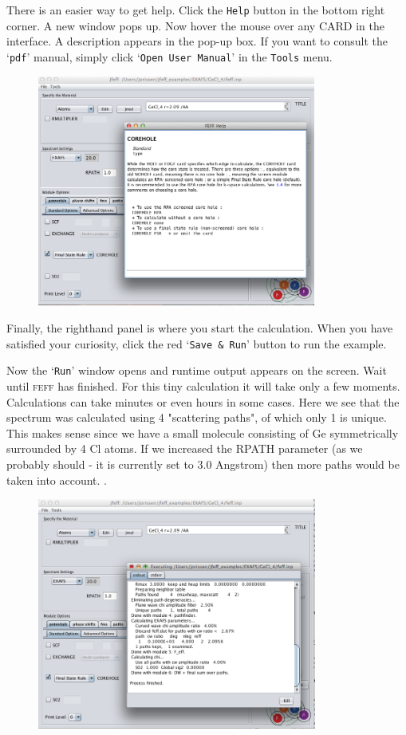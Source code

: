 \documentclass[11pt,oneside]{report} %
\newcommand{\program}[1]{\textsc{#1}}
\newcommand{\feff}{\program{feff}}
\newcommand{\file}[1]{`\texttt{#1}'}
\begin{document}
There is an easier way to get help.  Click the \texttt{Help} button in the bottom right corner.  A new window pops up.  Now hover the mouse over any CARD in the interface.  A description appears in the pop-up box.  If you want to consult the \file{pdf} manual, simply click \file{Open User Manual} in the \texttt{Tools} menu.

\begin{figure}[H]
	\centering
		\includegraphics[height=3.0in]{help1.png}
	\label{fig:help1}
\end{figure}

Finally, the righthand panel is where you start the calculation.  When you have satisfied your curiosity, click the red \file{Save \& Run} button to run the example.  

Now the \file{Run} window opens and runtime output appears on the screen.  Wait until {\feff} has finished.  For this tiny calculation it will take only a few moments.  Calculations can take minutes or even hours in some cases.  Here we see that the spectrum was calculated using 4 "scattering paths", of which only 1 is unique.  This makes sense since we have a small molecule consisting of Ge symmetrically surrounded by 4 Cl atoms.  If we increased the RPATH parameter (as we probably should - it is currently set to 3.0 Angstrom) then more paths would be taken into account.
.
\begin{figure}[H]
	\centering
		\includegraphics[height=3.0in]{run1.png}
	\label{fig:run1}
\end{figure}
\end{document}
